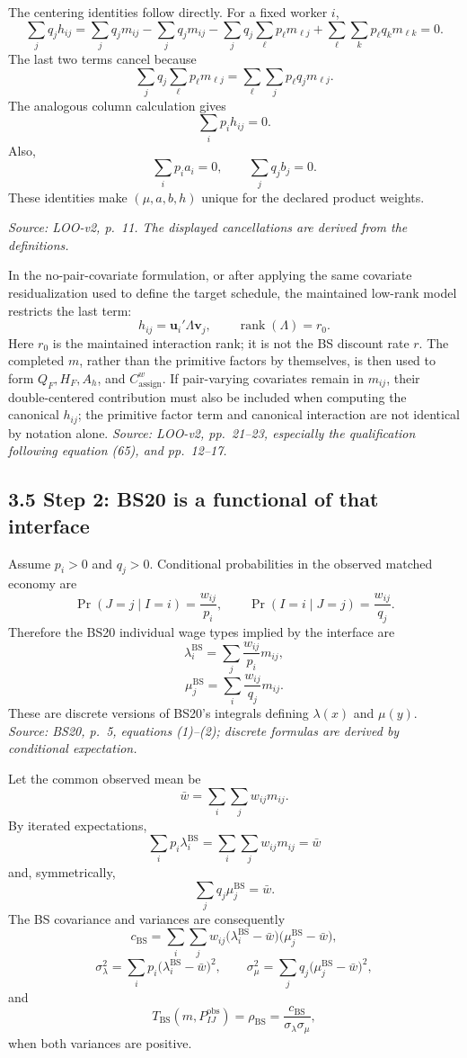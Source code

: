\documentclass[11pt]{article}
\begin{document}
The centering identities follow directly.  For a fixed worker \(i\),
\[
\sum_jq_jh_{ij}
=
\sum_jq_jm_{ij}
-\sum_jq_jm_{ij}
-\sum_jq_j\sum_\ell p_\ell m_{\ell j}
+\sum_\ell\sum_kp_\ell q_km_{\ell k}
=0.
\tag{T3.12}
\]
The last two terms cancel because
\[
\sum_jq_j\sum_\ell p_\ell m_{\ell j}
=
\sum_\ell\sum_jp_\ell q_jm_{\ell j}.
\]
The analogous column calculation gives
\[
\sum_ip_ih_{ij}=0.
\tag{T3.13}
\]
Also,
\[
\sum_ip_ia_i=0,
\qquad
\sum_jq_jb_j=0.
\tag{T3.14}
\]
These identities make \((\mu,a,b,h)\) unique for the declared product weights.

\textit{Source: LOO-v2, p.\ 11.  The displayed cancellations are derived
from the definitions.}

In the no-pair-covariate formulation, or after applying the same covariate
residualization used to define the target schedule, the maintained low-rank
model restricts the last term:
\[
h_{ij}
=
\mathbf u_i'\Lambda\mathbf v_j,
\qquad
\operatorname{rank}(\Lambda)=r_0.
\tag{T3.15}
\]
Here \(r_0\) is the maintained interaction rank; it is not the BS discount
rate \(r\).  The completed \(m\), rather than the primitive factors by
themselves, is then used to form \(Q_F,H_F,A_h\), and
\(C^w_{\mathrm{assign}}\).
If pair-varying covariates remain in \(m_{ij}\), their double-centered
contribution must also be included when computing the canonical \(h_{ij}\);
the primitive factor term and canonical interaction are not identical by
notation alone.
\textit{Source: LOO-v2, pp.\ 21--23, especially the qualification following
equation (65), and pp.\ 12--17.}

\subsection{3.5 Step 2: BS20 is a functional of that interface}

Assume \(p_i>0\) and \(q_j>0\).  Conditional probabilities in the observed
matched economy are
\[
\Pr(J=j\mid I=i)
=
\frac{w_{ij}}{p_i},
\qquad
\Pr(I=i\mid J=j)
=
\frac{w_{ij}}{q_j}.
\tag{T3.16}
\]
Therefore the BS20 individual wage types implied by the interface are
\[
\lambda_i^{\mathrm{BS}}
=
\sum_j\frac{w_{ij}}{p_i}m_{ij},
\tag{T3.17}
\]
\[
\mu_j^{\mathrm{BS}}
=
\sum_i\frac{w_{ij}}{q_j}m_{ij}.
\tag{T3.18}
\]
These are discrete versions of BS20's integrals defining
\(\lambda(x)\) and \(\mu(y)\).
\textit{Source: BS20, p.\ 5, equations (1)--(2); discrete formulas are
derived by conditional expectation.}

Let the common observed mean be
\[
\bar w
=
\sum_i\sum_jw_{ij}m_{ij}.
\tag{T3.19}
\]
By iterated expectations,
\[
\sum_ip_i\lambda_i^{\mathrm{BS}}
=
\sum_i\sum_jw_{ij}m_{ij}
=
\bar w
\tag{T3.20}
\]
and, symmetrically,
\[
\sum_jq_j\mu_j^{\mathrm{BS}}=\bar w.
\tag{T3.21}
\]
The BS covariance and variances are consequently
\[
c_{\mathrm{BS}}
=
\sum_i\sum_jw_{ij}
\bigl(\lambda_i^{\mathrm{BS}}-\bar w\bigr)
\bigl(\mu_j^{\mathrm{BS}}-\bar w\bigr),
\tag{T3.22}
\]
\[
\sigma_\lambda^2
=
\sum_ip_i\bigl(\lambda_i^{\mathrm{BS}}-\bar w\bigr)^2,
\qquad
\sigma_\mu^2
=
\sum_jq_j\bigl(\mu_j^{\mathrm{BS}}-\bar w\bigr)^2,
\tag{T3.23}
\]
and
\[
T_{\mathrm{BS}}(m,P^{\mathrm{obs}}_{IJ})
=
\rho_{\mathrm{BS}}
=
\frac{c_{\mathrm{BS}}}{\sigma_\lambda\sigma_\mu},
\tag{T3.24}
\]
when both variances are positive.
\end{document}
